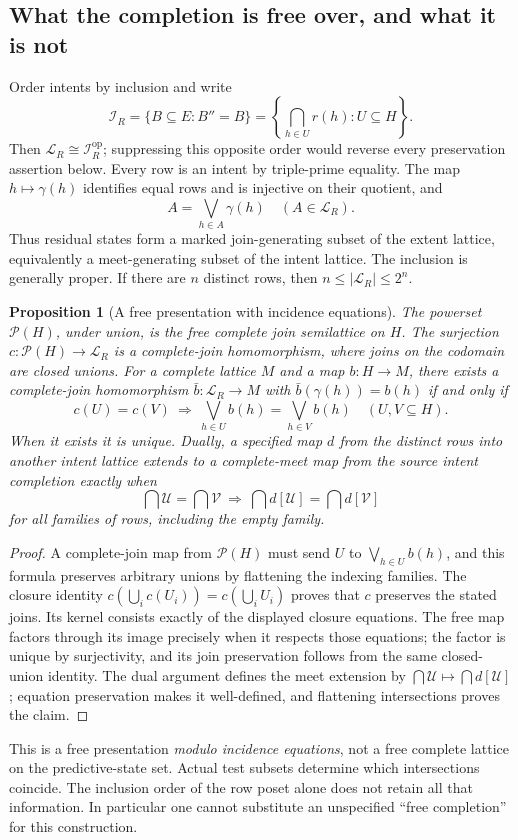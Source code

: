 \documentclass[11pt]{article}
\newtheorem{proposition}[theorem]{Proposition}
\theoremstyle{remark}
\begin{document}
\subsection{What the completion is free over, and what it is not}
Order intents by inclusion and write
\[
 \mathcal I_R=\{B\subseteq E:B''=B\}
 =\left\{\bigcap_{h\in U}r(h):U\subseteq H\right\}.
\]
Then $\mathcal L_R\cong\mathcal I_R^{\mathrm{op}}$; suppressing this
opposite order would reverse every preservation assertion below. Every
row is an intent by triple-prime equality. The map $h\mapsto\gamma(h)$
identifies equal rows and is injective on their quotient, and
\[
 A=\bigvee_{h\in A}\gamma(h)\quad(A\in\mathcal L_R).
\]
Thus residual states form a marked join-generating subset of the extent
lattice, equivalently a meet-generating subset of the intent lattice.
The inclusion is generally proper. If there are $n$ distinct rows, then
$n\leq |\mathcal L_R|\leq2^n$.

\begin{proposition}[A free presentation with incidence equations]
The powerset $\mathcal P(H)$, under union, is the free complete join
semilattice on $H$. The surjection $c:\mathcal P(H)\to\mathcal L_R$
is a complete-join homomorphism, where joins on the codomain are closed
unions. For a complete lattice $M$ and a map $b:H\to M$, there exists a
complete-join homomorphism $\bar b:\mathcal L_R\to M$ with
$\bar b(\gamma(h))=b(h)$ if and only if
\[
 c(U)=c(V)\ \Longrightarrow\
 \bigvee_{h\in U}b(h)=\bigvee_{h\in V}b(h)
 \quad(U,V\subseteq H).
\]
When it exists it is unique. Dually, a specified map $d$ from the distinct
rows into another intent lattice extends to a complete-meet map from the
source intent completion exactly when
\[
 \bigcap\mathcal U=\bigcap\mathcal V\ \Longrightarrow\
 \bigcap d[\mathcal U]=\bigcap d[\mathcal V]
\]
for all families of rows, including the empty family.
\end{proposition}
\begin{proof}
A complete-join map from $\mathcal P(H)$ must send $U$ to
$\bigvee_{h\in U}b(h)$, and this formula preserves arbitrary unions by
flattening the indexing families. The closure identity
$c(\bigcup_i c(U_i))=c(\bigcup_i U_i)$ proves that $c$ preserves the
stated joins. Its kernel consists exactly of the displayed closure
equations. The free map factors through its image precisely when it
respects those equations; the factor is unique by surjectivity, and its
join preservation follows from the same closed-union identity. The dual
argument defines the meet extension by
$\bigcap\mathcal U\mapsto\bigcap d[\mathcal U]$; equation preservation
makes it well-defined, and flattening intersections proves the claim.
\end{proof}
This is a free presentation \emph{modulo incidence equations}, not a free
complete lattice on the predictive-state set. Actual test subsets determine
which intersections coincide. The inclusion order of the row poset alone
does not retain all that information. In particular one cannot substitute
an unspecified ``free completion'' for this construction.
\end{document}
